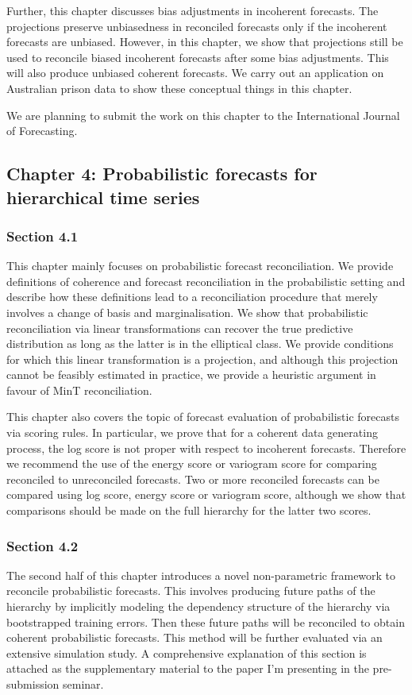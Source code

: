 Further, this chapter discusses bias adjustments in incoherent forecasts. The projections preserve unbiasedness in reconciled forecasts only if the incoherent forecasts are unbiased. However, in this chapter, we show that projections still be used to reconcile biased incoherent forecasts after some bias adjustments. This will also produce unbiased coherent forecasts. We carry out an application on Australian prison data to show these conceptual things in this chapter. 

We are planning to submit the work on this chapter to the International Journal of Forecasting. 



\subsection*{Chapter 4: Probabilistic forecasts for hierarchical time series}
\subsubsection*{Section 4.1}
This chapter mainly focuses on probabilistic forecast reconciliation. We provide definitions of coherence and forecast reconciliation in the probabilistic setting and describe how these definitions lead to a reconciliation procedure that merely involves a change of basis and marginalisation. We show that probabilistic reconciliation via linear transformations can recover the true predictive distribution as long as the latter is in the elliptical class. We provide conditions for which this linear transformation is a projection, and although this projection cannot be feasibly estimated in practice, we provide a heuristic argument in favour of MinT reconciliation.

This chapter also covers the topic of forecast evaluation of probabilistic forecasts via scoring rules. In particular, we prove that for a coherent data generating process, the log score is not proper with respect to incoherent forecasts. Therefore we recommend the use of the energy score or variogram score for comparing reconciled to unreconciled forecasts. Two or more reconciled forecasts can be compared using log score, energy score or variogram score, although we show that comparisons should be made on the full hierarchy for the latter two scores.

\subsubsection*{Section 4.2}
The second half of this chapter introduces a novel non-parametric framework to reconcile probabilistic forecasts. This involves producing future paths of the hierarchy by implicitly modeling the dependency structure of the hierarchy via bootstrapped training errors. Then these future paths will be reconciled to obtain coherent probabilistic forecasts. This method will be further evaluated via an extensive simulation study. A comprehensive explanation of this section is attached as the supplementary material to the paper I'm presenting in the pre-submission seminar. 

